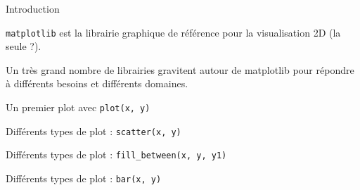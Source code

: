\begin{frame}{Introduction}

    \texttt{matplotlib} est la librairie graphique de référence pour la visualisation 2D (la seule ?).
    
    Un très grand nombre de librairies gravitent autour de matplotlib pour répondre à différents besoins et différents domaines.
\end{frame}

\begin{frame}{Un premier plot avec \texttt{plot(x, y)}}
    \begin{minipage}[t]{0.49\linewidth}
    \end{minipage}
    \begin{minipage}[t]{0.49\linewidth}
        \vfill
    \end{minipage}
\end{frame}

\begin{frame}{Différents types de plot : \texttt{scatter(x, y)}}
    \begin{minipage}[t]{0.49\linewidth}
    \end{minipage}
    \begin{minipage}[t]{0.49\linewidth}
        \vfill
    \end{minipage}
\end{frame}

\begin{frame}{Différents types de plot : \texttt{fill\_between(x, y, y1)}}
    \begin{minipage}[t]{0.49\linewidth}
    \end{minipage}
    \begin{minipage}[t]{0.49\linewidth}
        \vfill
    \end{minipage}
\end{frame}

\begin{frame}{Différents types de plot : \texttt{bar(x, y)}}
    \begin{minipage}[t]{0.49\linewidth}
    \end{minipage}
    \begin{minipage}[t]{0.49\linewidth}
        \vfill
    \end{minipage}
\end{frame}

